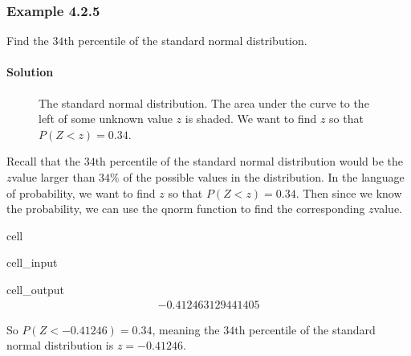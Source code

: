 \documentclass[letterpaper,10pt,english]{jupyterBook}
\begin{document}
\subsubsection{Example 4.2.5}
\label{\detokenize{Ch4 The Normal Distribution and the Central Limit Theorem/4.2 The Standard Normal Distribution:example-4-2-5}}
\sphinxAtStartPar
Find the \(34\)th percentile of the standard normal distribution.


\paragraph{Solution}
\label{\detokenize{Ch4 The Normal Distribution and the Central Limit Theorem/4.2 The Standard Normal Distribution:id8}}
\begin{figure}[htbp]
\centering
\capstart

\noindent{}
\caption{The standard normal distribution. The area under the curve to the left of some unknown value \(z\) is shaded. We want to find \(z\) so that \(P(Z < z) = 0.34\).}\label{\detokenize{Ch4 The Normal Distribution and the Central Limit Theorem/4.2 The Standard Normal Distribution:stdnormal-ex6}}\end{figure}

\sphinxAtStartPar
Recall that the \(34\)th percentile of the standard normal distribution would be the \(z\)\sphinxhyphen{}value larger than \(34\%\) of the possible values in the distribution. In the language of probability, we want to find \(z\) so that \(P(Z < z) = 0.34\). Then since we know the probability, we can use the qnorm function to find the corresponding \(z\)\sphinxhyphen{}value.

\begin{sphinxuseclass}{cell}\begin{sphinxVerbatimInput}

\begin{sphinxuseclass}{cell_input}
\begin{sphinxVerbatim}[commandchars=\\\{\}]
\end{sphinxVerbatim}

\end{sphinxuseclass}\end{sphinxVerbatimInput}
\begin{sphinxVerbatimOutput}

\begin{sphinxuseclass}{cell_output}\begin{equation*}
\begin{split}-0.412463129441405\end{split}
\end{equation*}
\end{sphinxuseclass}\end{sphinxVerbatimOutput}

\end{sphinxuseclass}
\sphinxAtStartPar
So \(P(Z < -0.41246) = 0.34\), meaning the \(34\)th percentile of the standard normal distribution is \(z = -0.41246\).
\end{document}

